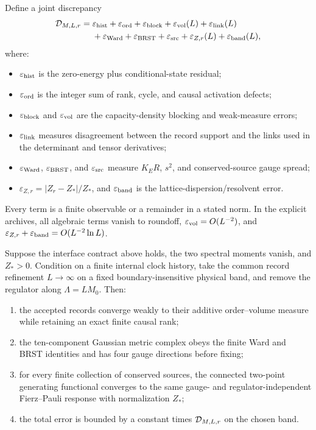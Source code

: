 Define a joint discrepancy
\begin{align}
 {\cal D}_{M,L,r}={}&
 \varepsilon_{\rm hist}+\varepsilon_{\rm ord}
 +\varepsilon_{\rm block}
 +\varepsilon_{\rm vol}(L)+\varepsilon_{\rm link}(L)\nonumber\\
 &+\varepsilon_{\rm Ward}+\varepsilon_{\rm BRST}
 +\varepsilon_{\rm src}+\varepsilon_{Z,r}(L)
 +\varepsilon_{\rm band}(L),
\label{eq:three-joint-discrepancy}
\end{align}
where:
\begin{itemize}
\item \(\varepsilon_{\rm hist}\) is the zero-energy plus
conditional-state residual;
\item \(\varepsilon_{\rm ord}\) is the integer sum of rank, cycle, and causal
activation defects;
\item \(\varepsilon_{\rm block}\) and \(\varepsilon_{\rm vol}\) are the
capacity-density blocking and weak-measure errors;
\item \(\varepsilon_{\rm link}\) measures disagreement between the record support
and the links used in the determinant and tensor derivatives;
\item \(\varepsilon_{\rm Ward}\), \(\varepsilon_{\rm BRST}\), and
\(\varepsilon_{\rm src}\) measure \(K_ER\), \(s^2\), and
conserved-source gauge spread;
\item \(\varepsilon_{Z,r}=|Z_r-Z_*|/Z_*\), and
\(\varepsilon_{\rm band}\) is the lattice-dispersion/resolvent error.
\end{itemize}
Every term is a finite observable or a remainder in a stated norm.
In the explicit archives, all algebraic terms vanish to roundoff,
\(\varepsilon_{\rm vol}=O(L^{-2})\), and
\(\varepsilon_{Z,r}+\varepsilon_{\rm band}=O(L^{-2}\ln L)\).

\begin{theorem}
\label{thm:three-chain-composition}
Suppose the interface contract above holds, the two spectral moments vanish,
and \(Z_*>0\).  Condition on a finite internal clock history, take the common
record refinement \(L\to\infty\) on a fixed boundary-insensitive physical
band, and remove the regulator along \(\Lambda=LM_0\).  Then:
\begin{enumerate}
\item the accepted records converge weakly to their additive
order--volume measure while retaining an exact finite causal rank;
\item the ten-component Gaussian metric complex obeys the finite Ward and
BRST identities and has four gauge directions before fixing;
\item for every finite collection of conserved sources, the connected
two-point generating functional converges to the same gauge- and
regulator-independent Fierz--Pauli response with normalization \(Z_*\);
\item the total error is bounded by a constant times
\({\cal D}_{M,L,r}\) on the chosen band.
\end{enumerate}
\end{theorem}

